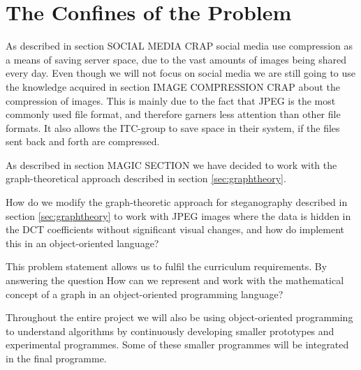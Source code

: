 \section{The Confines of the Problem}
As described in section SOCIAL MEDIA CRAP social media use compression as a means of saving server space, due to the vast amounts of images being shared every day. 
Even though we will not focus on social media we are still going to use the knowledge acquired in section IMAGE COMPRESSION CRAP about the compression of images. 
This is mainly due to the fact that JPEG is the most commonly used file format, and therefore garners less attention than other file formats.
It also allows the ITC-group to save space in their system, if the files sent back and forth are compressed.

As described in section MAGIC SECTION we have decided to work with the graph-theoretical approach described in section \ref{sec:graphtheory}.


\vspace{5mm}
\begin{centering}
	\begin{tcolorbox}[center title, title=Problem Statement, width=.8\textwidth]
How do we modify the graph-theoretic approach for steganography described in section \ref{sec:graphtheory} to work with JPEG images where the data is hidden in the DCT coefficients without significant visual changes, and how do implement this in an object-oriented language?
	\end{tcolorbox}
\end{centering}

This problem statement allows us to fulfil the curriculum requirements. By answering the question
How can we represent and work with the mathematical concept of a graph in an object-oriented programming language?


Throughout the entire project we will also be using object-oriented programming to understand algorithms by continuously developing smaller prototypes and experimental programmes.
Some of these smaller programmes will be integrated in the final programme.
